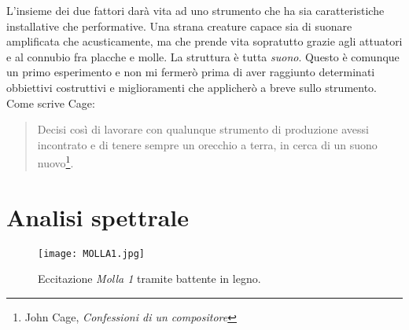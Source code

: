 L'insieme dei due fattori darà vita ad uno strumento che ha sia caratteristiche installative che performative. Una strana creature capace sia di suonare amplificata che acusticamente, ma che prende vita sopratutto grazie agli attuatori e al connubio fra placche e molle. La struttura è tutta \textit{suono}. Questo è comunque un primo esperimento e non mi fermerò prima di aver raggiunto determinati obbiettivi costruttivi e miglioramenti che applicherò a breve sullo strumento. Come scrive Cage:
\begin{small}
\begin{quotation}
Decisi così di lavorare con qualunque strumento di produzione avessi incontrato e di tenere sempre un orecchio a terra, in cerca di un suono nuovo\footnote{John Cage, \textit{Confessioni di un compositore}}.
\end{quotation}
\end{small}

\section{Analisi spettrale}
\begin{figure}[htbp]
\begin{center}
\texttt{[image: MOLLA1.jpg]}
\caption{Eccitazione \textit{Molla 1} tramite battente in legno.}
\label{default}
\end{center}
\end{figure}

